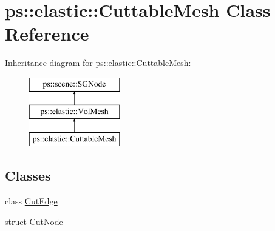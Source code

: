 \hypertarget{classps_1_1elastic_1_1CuttableMesh}{}\section{ps\+:\+:elastic\+:\+:Cuttable\+Mesh Class Reference}
\label{classps_1_1elastic_1_1CuttableMesh}
Inheritance diagram for ps\+:\+:elastic\+:\+:Cuttable\+Mesh\+:\begin{figure}[H]
\begin{center}
\leavevmode
\includegraphics[height=3.000000cm]{classps_1_1elastic_1_1CuttableMesh}
\end{center}
\end{figure}
\subsection*{Classes}
\begin{DoxyCompactItemize}
\item 
class \hyperlink{classps_1_1elastic_1_1CuttableMesh_1_1CutEdge}{Cut\+Edge}
\item 
struct \hyperlink{structps_1_1elastic_1_1CuttableMesh_1_1CutNode}{Cut\+Node}
\end{DoxyCompactItemize}
